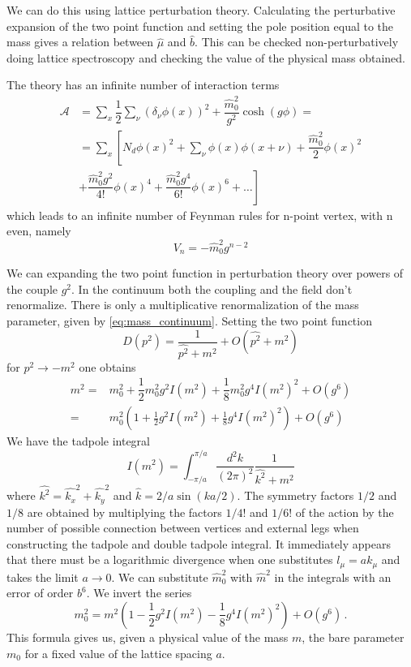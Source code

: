 \documentclass[12pt,a4paper]{report}
\begin{document}
We can do this using lattice perturbation theory. Calculating the perturbative expansion of the two point function and setting the pole position equal to the mass gives a relation between $ \hat \mu$ and $\hat b$. This can be checked non-perturbatively doing lattice spectroscopy and checking the value of the physical mass obtained.

The theory has an infinite number of interaction terms \begin{align}
\mathcal{A} &= \sum_x \dfrac{1}{2} \sum_\nu  (\delta_\nu \phi(x))^2 + \dfrac{\hat m_0^2}{g^2} \cosh(g \phi) =\\
  &= \sum_x \left[ N_d \phi(x)^2 +  \sum_\nu \phi(x) \phi(x+\nu) +  \dfrac{\hat m_0^2 }{2}\phi(x)^2 \right. \nonumber \\
  &\left. +   \dfrac{ \hat m_0^2 g^2}{4!} \phi(x)^4 +  \dfrac{ \hat m_0^2 g^4}{6!} \phi(x)^6 + \dots  \right]
\end{align} which leads to an infinite number of Feynman rules for n-point vertex, with n even, namely \begin{equation}
V_n = - \hat m_0^2 g^{n-2}
\end{equation}
 
  We can expanding the two point function in perturbation theory over powers of the couple $g^2$. In the continuum both the coupling and the field don't renormalize. There is only a multiplicative renormalization of the mass parameter, given by \eqref{eq:mass_continuum}. Setting the two point function \begin{equation}
  D(p^2) = \dfrac{1}{\hat{p^2}+ m^2} +O(\hat{p^2} +m^2)
\end{equation}  for $p^2 \to -m^2$ one obtains \begin{align}
  m^2=&   m_0^2  +\dfrac{1}{2}   m_0^2 g^2 I( m^2)+ \dfrac{1}{8}  m_0^2 g^4 I( m^2)^2 + O(g^6) \\
 = &  m_0^2 (1 + \frac{1}{2}g^2 I( m^2) + \frac{1}{8} g^4 I( m^2)^2 ) + O(g^6 )
 \end{align} We have  the tadpole integral \begin{equation}
 \label{eq:tadpole}
 I(m^2) = \int_{-\pi/a}^{\pi/a} \dfrac{d^2k}{(2 \pi)^2} \dfrac{1}{\hat{k^2} + m^2
  }
 \end{equation} where $\hat{k^2} = \hat{k_x}^2 + \hat{k_y}^2$ and $\hat k = 2/a \sin (ka/2)$. The symmetry factors $1/2$ and $1/8$ are obtained by multiplying the factors $1/4!$ and $1/6!$ of the action by the number of possible connection between vertices and external legs when constructing the tadpole and double tadpole integral.
 It immediately appears that there must be a logarithmic divergence when one substitutes $l_\mu = a k_\mu$ and takes the limit $a\to 0$. 
 We can substitute $\hat m_0^2$ with $\hat m^2$ in the integrals with an error of order $b^6$. We invert the series \begin{equation}
  m_0^2 =  m^2(1 - \frac{1}{2}g^2 I(  m^2) - \frac{1}{8} g^4 I(m^2)^2 ) + O( g^6 ) \,.
 \end{equation} This formula gives us, given a physical value of the mass $m$, the bare parameter $m_0$ for a fixed value of the lattice spacing $a$. 
\end{document}
